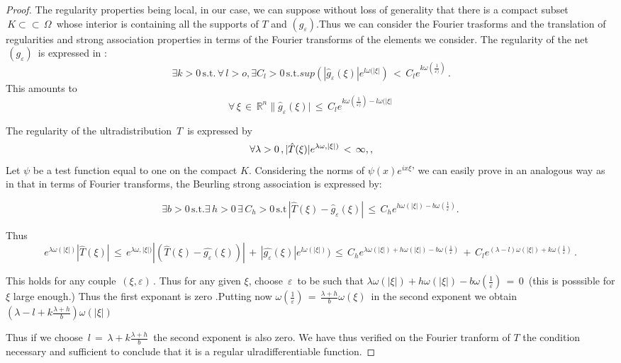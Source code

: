 \documentclass[12pt,a4paper]{amsart}
\newcommand{\RR}{\mathbb R}
\begin{document}
  \begin{proof}
 The regularity properties being local, in our case, we can suppose without loss of generality that there is a compact subset $\,K\subset\subset\,\Omega\,$ whose interior is  containing all the supports of $T$ and $(g_\varepsilon)$.Thus we can consider the Fourier trasforms and the translation of regularities and strong association properties  in terms of the Fourier transforms 
 of the elements we consider.
  The regularity of the net $\,(g_\varepsilon)\,$
  is expressed in :
  $$\,\exists k>0\, \mbox{s.t.}\, \forall\,l>o, \exists C_l>0\,\mbox{s.t.}
sup(|\hat{g}_\varepsilon(\xi)|e^{l\omega(|\xi|})\,<\,
C_le^{k\omega(\frac{1}{\varepsilon)})}\,.$$
 This amounts to
 $$\forall\, \xi\,\in\,\RR^n \|\hat{g}_\varepsilon(\xi)|\,\leq\,
 C_le^{k\omega(\frac{1}{\varepsilon)})-l\omega(|\xi|}
 $$ 

 The regularity of the ultradistribution $\,T\,$ is expressed by 
 $$\,\forall \lambda>0\,
 ,|\hat{T}(\xi)|e^{\lambda\omega,|\xi|)}\,
 <\,\infty\\,,$$ 
 Let $\psi$ be a test function equal to one on the compact $K.$  Considering the norms of 
 $ \psi(x)e^{ix\xi}$' we can easily prove in an analogous way as in \cite{D.V.V.} that                                               
 in terms of Fourier transforms, the Beurling strong association is expressed  by:
 
 $$\exists b>0\,\mbox{s.t.} \exists\, h>0\,\exists\,C_h>0
 \,\mbox{s.t}\,
 |\hat{T}(\xi)-\hat{g}_\varepsilon(\xi)|\,\leq\,
 C_he^{h\omega(|\xi|)-b\omega(\frac{1}{\varepsilon})}.$$
 
 Thus
 \begin{equation*}
  e^{\lambda\omega(|\xi|)}|\hat{T}(\xi)|\,\leq\,
 e^{\lambda\omega,|\xi|)}|(\hat{T}(\xi)-
 \hat{g_\varepsilon} (\xi))|\,+
 \,|\hat{g_\varepsilon}(\xi)|e^{l\omega(|\xi|)})\,\leq
 \,C_he^{\lambda\omega(|\xi|)+h\omega(|\xi|)
 -b\omega(\frac{1}{\varepsilon})}\,+\,
 C_le^{(\lambda-l)\omega(|\xi|)+
 k\omega(\frac{1}{\varepsilon})}\,.
 \end{equation*}
 
 This holds for any couple $\,(\xi,\varepsilon)\,.$
 Thus for any given $\xi$, choose $\,\varepsilon\,$ to be such that
  $\lambda\omega(|\xi|)+h\omega(|\xi|)-
  b\omega(\frac{1}{\varepsilon})\,=\,0\,$ (this is posssible for $\xi$ large enough.)
  Thus the first exponant is zero .Putting now
  $\omega(\frac{1}{\varepsilon})\,
  =\,\frac{\lambda+h}{b}\omega(\xi)\,$ in the second exponent we obtain $(\lambda-l+k\frac{\lambda+h}{b})\omega(|\xi|)$
  
  Thus if we choose
   $\,l\,=\,\lambda+k\frac{\lambda+h}{b} \,$
    the second exponent is also zero.
     We have thus verified  on the Fourier tranform of $T$ the condition necessary and sufficient to conclude that it is a regular ulradifferentiable function.
     \end{proof}
\end{document}
